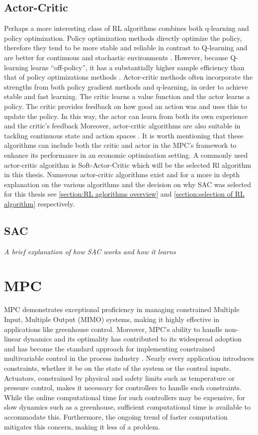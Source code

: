 \subsection{Actor-Critic}
Perhaps a more interesting class of RL algorithms combines both q-learning and policy optimization. Policy optimization methods directly optimize the policy, therefore they tend to be more stable and reliable in contrast to Q-learning and are better for continuous and stochastic environments \cite{suttonReinforcementLearningIntroduction2014}. However, because Q-learning learns ``off-policy'', it has a substantially higher sample efficiency than that of policy optimizations methods \cite{suttonReinforcementLearningIntroduction2014}.
Actor-critic methods often incorporate the strengths from both policy gradient methods and q-learning, in order to achieve stable and fast learning. The critic learns a value function and the actor learns a policy. The critic provides feedback on how good an action was and uses this to update the policy. In this way, the actor can learn from both its own experience and the critic's feedback 
Moreover, actor-critic algorithms are also suitable in tackling continuous state and action spaces \cite{suttonReinforcementLearningIntroduction2014}. It is worth mentioning that these algorithms can include both the critic and actor in the MPC's framework to enhance its performance in an economic optimisation setting. A commonly used actor-critic algorithm  is Soft-Actor-Critic which will be the selected Rl algorithm in this thesis. Numerous actor-critic algorithms exist and for a more in depth explanation on the various algorithms and the decision on why SAC was selected  for this thesis see \autoref{section:RL aglorithms overview} and \autoref{section:selection of RL algorithm} respectively.

\subsection{SAC}
\emph{A brief explanation of how SAC works and how it learns}


\section{MPC}\label{section:MPC}
MPC demonstrates exceptional proficiency in managing constrained Multiple Input, Multiple Output (MIMO) systems, making it highly effective in applications like greenhouse control. Moreover, MPC's ability to handle non-linear dynamics and its optimality has contributed to its widespread adoption and has become the standard approach for implementing constrained multivariable control in the process industry \cite{daiDiscreteTimeModelPredictive2012}. Nearly every application introduces constraints, whether it be on the state of the system or the control inputs. Actuators, constrained by physical and safety limits such as temperature or pressure control, makes it necessary for controllers to handle such constraints. While the online computational time for such controllers may be expensive, for slow dynamics such as a greenhouse, sufficient computational time is available to accommodate this. Furthermore, the ongoing trend of faster computation mitigates this concern, making it less of a problem.

